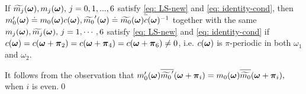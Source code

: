 \begin{comment}
Let $C_{\V{\omega}} = det(\M[\widehat{k_{\V{\omega}}},:])$, then we have the following observation.
\begin{lemma}\label{lem: equal-det}
$C_{\V{\omega}} = C_{\V{\omega}+\V{\pi}_2} = C_{\V{\omega}+\V{\pi}_4} = C_{\V{\omega}+\V{\pi}_6}$
\end{lemma}
\noindent{\it Proof}
Because $\widetilde{M}(\V{\omega}+\V{\pi}_2) = P_{\V{\pi}_2}\M(\V{\omega})$ where $P_{\V{\pi}_2}$ is a row permutation matrix, it follows from the definition of $C_{\V{\omega}}$ that 
$C_{\V{\omega}} = det\big(\M[\widehat{k_{\V{\omega}}},:](\V{\omega})\big) = det\big(\M[-k_{\V{\omega}+\V{\pi}_2},:](\V{\omega}+\V{\pi}_2) \big)= C_{\V{\omega}+\V{\pi}_2}$ where 
$\mathbf{1}_{k_{\V{\omega}+\V{\pi}_2}} = P_{\V{\pi}_2}\mathbf{1}_{\widehat{k_{\V{\omega}}}}$.
\qed\\[1em]
We assume that $m_0\in\mathbb{R}_{\geq 0}$ without phase. Let $m_0^C(\V{\omega}) = m_0(\V{\omega})|C_{\V{\omega}}|\in \mathbb{R}_{\geq 0}$ and $\mc{0} = \m{0}/|C_{\V{\omega}}|$, then Lemma \ref{lem: equal-det} implies the following.
\end{comment}


\begin{proposition}\label{prop: mc}
If $\widetilde{m_{j}}(\boldsymbol{\omega}), m_j(\boldsymbol{\omega}),\,  j = 0,1,...,6$ satisfy \eqref{eq: LS-new} and \eqref{eq: identity-cond}, 
then $m_0'(\V{\omega})\doteq m_0(\V{\omega})c(\V{\omega}), \widetilde{m_0}'(\V{\omega})\doteq \m{0}\overlinespace{c}(\V{\omega})^{-1}$ together with the same $m_j(\boldsymbol{\omega}),\widetilde{m_{j}}(\boldsymbol{\omega}), \, j = 1,\cdots,6$ 
satisfy \eqref{eq: LS-new} and \eqref{eq: identity-cond} if $ c(\boldsymbol{\omega}) = c(\boldsymbol{\omega}+\boldsymbol{\pi}_2)=c(\boldsymbol{\omega}+\boldsymbol{\pi}_4) = c(\boldsymbol{\omega}+\boldsymbol{\pi}_6) \neq 0$, i.e. $c(\boldsymbol{\omega})$ is $\pi$-periodic in both $\omega_1$ and $\omega_2$.
\end{proposition}
It follows from the observation that $m_0'(\V{\omega})\overline{\widetilde{m_0}'}(\V{\omega} + \V{\pi}_i) = m_0(\V{\omega})\sbarmp{0}{i},\,$ when $i$ is even.\qed


